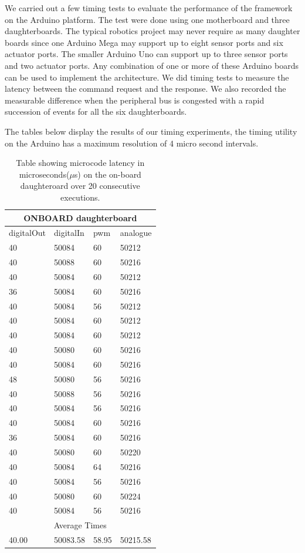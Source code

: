 We carried out a few timing tests to evaluate the performance of the \xten framework on the Arduino platform. The test were done using one motherboard and three daughterboards. The typical robotics project may never require as many daughter boards since one Arduino Mega may support up to eight sensor ports and six actuator ports. The smaller Arduino Uno can support up to three sensor ports and two actuator ports. Any combination of one or more of these Arduino boards can be used to implement the \xten architecture.
We did timing tests to measure the latency between the command request and the response. We also recorded the measurable difference when the peripheral bus is congested with a rapid succession of events for all the six daughterboards.

The tables below display the results of our timing experiments, the timing utility on the Arduino has a maximum resolution of 4 micro second intervals.

\begin{table}[h!]
	\caption{Table showing microcode latency in microseconds($\mu$s) on the on-board daughteroard over 20 consecutive executions.}
	\begin{tabular}{|l|l|l|l|}
	\toprule
 \multicolumn{4}{c}{\textbf{ONBOARD daughterboard}} \\\hline

digitalOut & digitalIn & pwm & analogue \\\hline
40 & 50084 & 60 & 50212\\\hline
40 & 50088 & 60 & 50216 \\\hline
40 & 50084 & 60 & 50212 \\\hline
36 & 50084 & 60 & 50216 \\\hline
40 & 50084 & 56 & 50212 \\\hline
40 & 50084 & 60 & 50212 \\\hline
40 & 50084 & 60 & 50212 \\\hline
40 & 50080 & 60 & 50216 \\\hline
40 & 50084 & 60 & 50216 \\\hline
48 & 50080 & 56 & 50216 \\\hline
40 & 50088 & 56 & 50216 \\\hline
40 & 50084 & 56 & 50216 \\\hline
40 & 50084 & 60 & 50216 \\\hline
36 & 50084 & 60 & 50216 \\\hline
40 & 50080 & 60 & 50220 \\\hline
40 & 50084 & 64 & 50216 \\\hline
40 & 50084 & 56 & 50216 \\\hline
40 & 50080 & 60 & 50224 \\\hline
40 & 50084 & 56 & 50216 \\\hline
\multicolumn{4}{c}{Average Times} \\\hline
40.00 & 50083.58 & 58.95 & 50215.58

\end{tabular}
\end{table}

